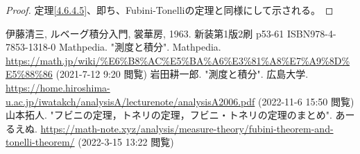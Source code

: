 \documentclass[dvipdfmx]{jsarticle}
\begin{document}
\begin{proof} 定理\ref{4.6.4.5}、即ち、Fubini-Tonelliの定理と同様にして示される。
\end{proof}
\begin{thebibliography}{50}
  伊藤清三, ルベーグ積分入門, 裳華房, 1963. 新装第1版2刷 p53-61 ISBN978-4-7853-1318-0
  Mathpedia. "測度と積分". Mathpedia. \url{https://math.jp/wiki/%E6%B8%AC%E5%BA%A6%E3%81%A8%E7%A9%8D%E5%88%86} (2021-7-12 9:20 閲覧)
  岩田耕一郎. "測度と積分". 広島大学. \url{https://home.hiroshima-u.ac.jp/iwatakch/analysisA/lecturenote/analysisA2006.pdf} (2022-11-6 15:50 閲覧)
  山本拓人. "フビニの定理，トネリの定理，フビニ・トネリの定理のまとめ". あーるえぬ. \url{https://math-note.xyz/analysis/measure-theory/fubini-theorem-and-tonelli-theorem/} (2022-3-15 13:22 閲覧)
\end{thebibliography}
\end{document}
